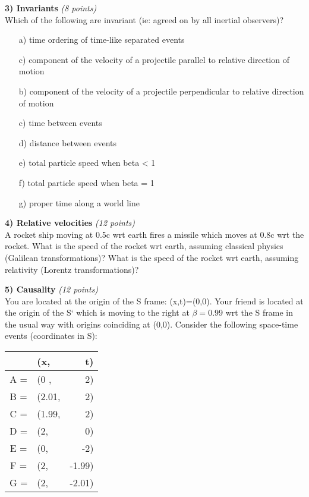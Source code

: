{\textbf{3) Invariants }\hfill \textit{(8 points)}\\
Which of the following are invariant (ie: agreed on by all inertial observers)?
\begin{itemize}
\item[a)] time ordering of time-like separated events
\item[c)] component of the velocity of a projectile parallel to relative direction of motion
\item[b)] component of the velocity of a projectile perpendicular to relative direction of motion
\item[c)] time between events
\item[d)] distance between events
\item[e)] total particle speed when beta < 1
\item[f)] total particle speed when beta = 1
\item[g)] proper time along a world line
\end{itemize}

\clearpage

\textbf{4) Relative velocities }\hfill \textit{(12 points)}\\

A rocket ship moving at 0.5c wrt earth fires a missile which moves at 0.8c wrt the rocket.
What is the speed of the rocket wrt earth, assuming classical physics (Galilean transformations)?
What is the speed of the rocket wrt earth, assuming relativity (Lorentz transformations)?

\vspace{2.8in}

\textbf{5) Causality}  \hfill \textit{(12 points)}\\
You are located at the origin of the S frame: (x,t)=(0,0).
Your friend is located at the origin of the S` which is moving to the right at $\beta = 0.99$ wrt the S frame in the usual way with origins coinciding at (0,0).
Consider the following space-time events (coordinates in S):\\
\begin{tabular}{clr}
  & (x,& t)\\
  \hline
  A = & (0   , & 2)\\
  B = & (2.01, & 2)\\
  C = & (1.99, & 2)\\
  D = & (2,    & 0)\\
  E = & (0,    & -2)\\
  F = & (2,    & -1.99)\\
  G = & (2,    & -2.01)\\
\end{tabular}

}
